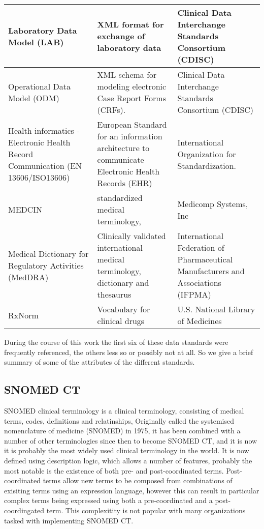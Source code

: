\documentclass[runningheads]{llncs}
\begin{document}
\begin{table}[!htbp]
\begin{center}
\begin{tabular}{ p{3cm} | p{6cm} | p{5cm }  }
					\hline
				Laboratory Data Model (LAB)  &  XML format for exchange of laboratory data &  Clinical Data Interchange Standards Consortium (CDISC)  \\
					\hline
				Operational Data Model (ODM) &  XML schema for modeling electronic Case Report Forms (CRFs).  &  Clinical Data Interchange Standards Consortium (CDISC)  \\
					\hline
				Health informatics - Electronic Health Record Communication (EN 13606/ISO13606)   &  European Standard for an information architecture to communicate Electronic Health Records (EHR) &  International Organization for Standardization.   \\
					\hline
				MEDCIN  &  standardized medical terminology, &  Medicomp Systems, Inc  \\
					\hline
				Medical Dictionary for Regulatory Activities (MedDRA) &  Clinically validated international medical terminology, dictionary and thesaurus  &   International Federation of Pharmaceutical Manufacturers and Associations (IFPMA) \\
				\hline
				RxNorm &  Vocabulary for clinical drugs &  U.S. National Library of Medicines  \\
			\end{tabular}
		\end{center}
	\end{table}
	
	
	\FloatBarrier
	
	During the course of this work the first six of these data standards were frequently referenced, the others less so or possibly not at all. So we give a brief summary of some of the attributes of the different standards.
	
	\subsection{SNOMED CT}
	SNOMED clinical terminology is a clinical terminology, consisting of medical terms, codes, definitions and relatinships,  Originally called the systemised nomenclature of medicine (SNOMED) in 1975, it has been combined with a number of other terminologies since then to become SNOMED CT, and it is now it is probably the most widely used clinical terminology in the world. It is now defined using description logic, which allows a number of features, probably the most notable is the existence of both pre- and post-coordinated terms. Post-coordinated terms allow new terms to be composed from combinations of exisiting terms using an expression language, however this can result in particular complex terms being expressed using both a pre-coordinated and a post-coordingated term. This complexitity is not popular with many organizations tasked with implementing SNOMED CT. 
	
\end{document}
